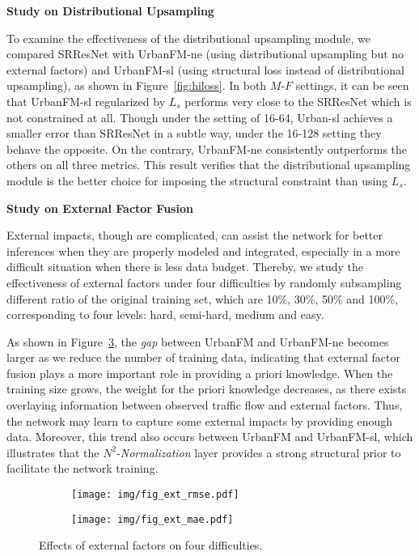 \vspace{2em}
\noindent\textbf{Study on Distributional Upsampling}

\noindent To examine the effectiveness of the distributional upsampling module, we compared SRResNet with UrbanFM-ne (using distributional upsampling but no external factors) and UrbanFM-sl (using structural loss instead of distributional upsampling), as shown in Figure~\ref{fig:hiloss}. In both $M$-$F$ settings, it can be seen that UrbanFM-sl regularized by $L_s$ performs very close to the SRResNet which is not constrained at all. Though under the setting of 16-64, Urban-sl achieves a smaller error than SRResNet in a subtle way, under the 16-128 setting they behave the opposite. On the contrary, UrbanFM-ne consistently outperforms the others on all three metrics. This result verifies that the distributional upsampling module is the better choice for imposing the structural constraint than using $L_s$.

\vspace{1mm}
\noindent\textbf{Study on External Factor Fusion}

\noindent External impacts, though are complicated, can assist the network for better inferences when they are properly modeled and integrated, especially in a more difficult situation when there is less data budget. Thereby, we study the effectiveness of external factors under four difficulties by randomly subsampling different ratio of the original training set, which are 10\%, 30\%, 50\% and 100\%, corresponding to four levels: hard, semi-hard, medium and easy.

As shown in Figure~\ref{fig:ext_effect}, the \textit{gap} between UrbanFM and UrbanFM-ne becomes larger as we reduce the number of training data, indicating that external factor fusion plays a more important role in providing a priori knowledge. When the training size grows, the weight for the priori knowledge decreases, as there exists overlaying information between observed traffic flow and external factors. Thus, the network may learn to capture some external impacts by providing enough data. Moreover, this trend also occurs between UrbanFM and UrbanFM-sl, which illustrates that the $N^2$-\textit{Normalization} layer provides a strong structural prior to facilitate the network training.


\begin{figure}[h!]
	\centering
	\begin{subfigure}[b]{0.225\textwidth}
		\texttt{[image: img/fig\_ext\_rmse.pdf]}	
		\label{fig:ext_rmse}
	\end{subfigure}
	\hspace{1mm}
	\begin{subfigure}[b]{0.225\textwidth}
		\texttt{[image: img/fig\_ext\_mae.pdf]}
		\label{fig:ext_mae}
	\end{subfigure}
	\vspace{-1em}
	\caption{Effects of external factors on four difficulties.}
	\label{fig:ext_effect}
\end{figure}




